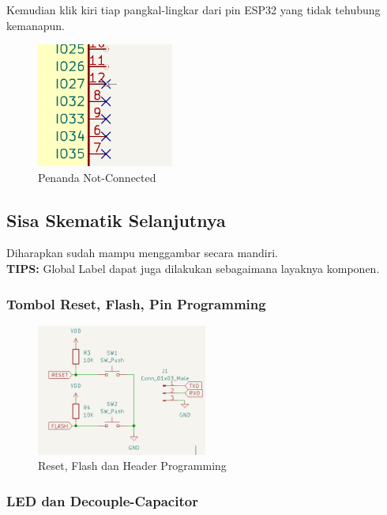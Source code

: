 \documentclass[12pt]{book}
\begin{document}
	Kemudian klik kiri tiap pangkal-lingkar dari pin ESP32 yang tidak tehubung kemanapun.

	\begin{figure}[!ht]
		\centering
		\includegraphics[width=0.4\textwidth]{images/sch/sch_17}
		\caption{Penanda Not-Connected}
	\end{figure}

	\subsection{Sisa Skematik Selanjutnya}

	Diharapkan sudah mampu menggambar secara mandiri.\\

	\textbf{TIPS:} Global Label dapat juga dilakukan  sebagaimana layaknya komponen.

	\subsubsection{Tombol Reset, Flash, Pin Programming}

	\begin{figure}[!ht]
		\centering
		\includegraphics[width=0.5\textwidth]{images/sch/sch_18}
		\caption{Reset, Flash dan Header Programming}
	\end{figure}

	\newpage
	\subsubsection{LED dan Decouple-Capacitor}
\end{document}
